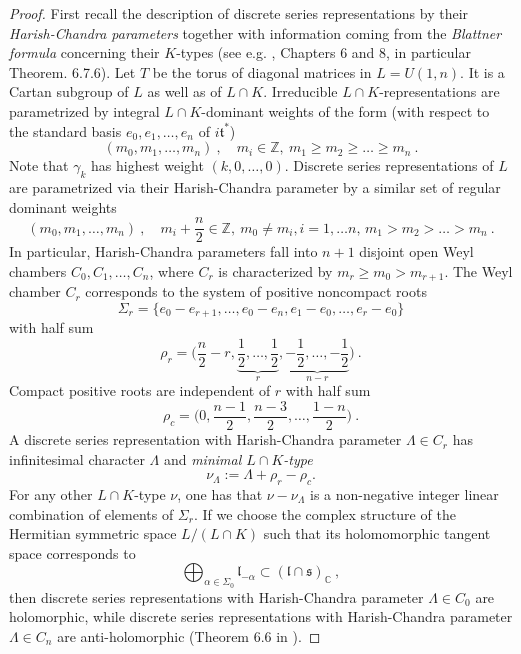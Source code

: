 \documentclass[10]{amsart}
\theoremstyle{remark}
\theoremstyle{definition}
\numberwithin{equation}{section}
\newcommand{\C}{\mathbb{C}}           %
\newcommand{\fl}{{\mathfrak l}}
\newcommand{\ft}{{\mathfrak t}}
\newcommand{\fs}{{\mathfrak s}}
\newcommand{\beu}{\begin{equation*}}
\newcommand{\defn}{{:=}}
\begin{document}
{\begin{proof}
First recall the description of discrete series representations by their {\it Harish-Chandra parameters} together with information coming from the 
{\it Blattner formula} concerning their $K$-types (see e.g. \cite{Wa88}, Chapters 6 and 8, in particular Theorem. 6.7.6). Let $T$ be the torus of diagonal 
matrices in $L=U(1,n)$. It is a Cartan subgroup of $L$ as well as of $L\cap K$. Irreducible $L\cap K$-representations are parametrized by integral 
$L\cap K$-dominant weights of the form (with respect to the standard basis $e_0,e_1,\dots, e_n$ of ${i}\ft^*$) 
$$ (m_0,m_1,\dots,m_n)\ ,\quad m_i\in\mathbb{Z},\  m_1\geq m_2\geq\dots\geq m_n\ .$$
Note that $\gamma_k$ has highest weight $(k,0,\dots,0)$. Discrete series representations of $L$ are parametrized via their Harish-Chandra parameter
by a similar set of regular dominant weights 
$$ (m_0,m_1,\dots,m_n)\ ,\quad m_i+\frac{n}{2}\in\mathbb{Z},\  m_0\ne m_i, i=1,\dots n,\, m_1> m_2>\dots> m_n\ .$$
In particular, Harish-Chandra parameters fall into $n+1$ disjoint open Weyl chambers $C_0,C_1,\dots,C_n$, where $C_r$ is characterized by 
$m_{r}\geq m_0>m_{r+1}$. The Weyl chamber $C_r$ corresponds to the system of positive noncompact roots 
$$\Sigma_r=\{e_0-e_{r+1},\dots,e_0-e_{n}, e_1-e_0,\dots, e_r-e_0\}$$
with half sum
$$\rho_r =\big (\frac{n}{2}-r,\underbrace{\frac{1}{2},\dots,\frac{1}{2}}_r,\underbrace{-\frac{1}{2},\dots,-\frac{1}{2}}_{n-r}\big )\ .$$
Compact positive roots are independent of $r$ with half sum
$$\rho_c =\big (0,\frac{n-1}{2},\frac{n-3}{2},\dots,\frac{1-n}{2}\big )\ .$$
A discrete series representation with Harish-Chandra parameter $\Lambda\in C_r$ has infinitesimal character $\Lambda$ and {\it minimal $L\cap K$-type} 
%
\beu
\nu_\Lambda\defn\Lambda+\rho_r-\rho_c. 
\end{equation*}
%
For any other $L\cap K$-type $\nu$, one has that $\nu-\nu_\Lambda$ is a non-negative integer linear combination 
of elements of $\Sigma_r$. 
If we choose the complex structure of the Hermitian symmetric space $L/(L\cap K)$ such that its holomomorphic tangent space corresponds to
$$ \bigoplus_{\alpha\in \Sigma_0} \fl_{-\alpha}\subset (\fl\cap\fs)_\C\ ,$$
then discrete series representations with Harish-Chandra parameter $\Lambda\in C_0$ are holomorphic, 
while discrete series representations with Harish-Chandra parameter $\Lambda\in C_n$ are anti-holomorphic (Theorem 6.6 in \cite{Kn86}).


\end{proof}}
\end{document}
